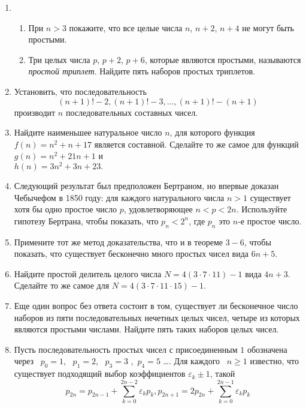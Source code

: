 \documentclass[11pt]{article}
\begin{document}
\begin{enumerate}
\item
\begin{enumerate}
\item При $n> 3$ покажите, что все целые числа $n$, $n + 2$, $n + 4$ не могут быть простыми.
\item Три целых числа $p$, $p + 2$, $p + 6$, которые являются простыми, называются \textit{простой триплет}. Найдите пять наборов простых триплетов.
\end{enumerate}

\item Установить, что последовательность 
\[
(n+1)!-2, (n+1)!-3, \ldots,(n+1)!-(n+1)
\]
производит $n$ последовательных составных чисел.

\item	Найдите наименьшее натуральное число $n$, для которого функция $f(n) = n^2 + n +17$ является составной. Сделайте то же самое для функций $g (n) = n^2+ 21n + 1$ и \\
$h(n)=3n^2+ 3n + 23.$

\item	Следующий результат был предположен Бертраном, но впервые доказан Чебычефом в 1850 году: для каждого натурального числа $n > 1$ существует хотя бы одно простое число $p$, удовлетворяющее $n<p<2n$. Используйте гипотезу Бертрана, чтобы показать, что $p_n<2^n$, где $p_n$ это $n$-е простое число.

\item	Примените тот же метод доказательства, что и в теореме $3-6$, чтобы показать, что существует бесконечно много простых чисел вида $6n+ 5$.

\item Найдите простой делитель целого числа $N= 4 (3 \cdot  7 \cdot  11) - 1$ вида $4n + 3$. Сделайте то же самое для $N = 4(3 \cdot 7 \cdot  11 \cdot  15) - 1$.

\item	Еще один вопрос без ответа состоит в том, существует ли бесконечное число наборов из пяти последовательных нечетных целых чисел, четыре из которых являются простыми числами. Найдите пять таких наборов целых чисел.

\item	Пусть последовательность простых чисел с присоединенным $1$ обозначена через ~$p_0= 1$, ~$p_1 = 2$, ~$p_3= 3$ ,~$p_4= 5$ \ldots . Для каждого ~$n\geq 1$ известно, что существует подходящий выбор коэффициентов $\varepsilon_k \pm 1$, такой
\[
p_{2n}=p_{2n-1}+\sum_{k=0}^{2n-2} \varepsilon_kp_k, p_{2n+1}=2p_{2n}+\sum_{k=0}^{2n-1} \varepsilon_kp_k
\]
 

\end{enumerate}
\end{document}
